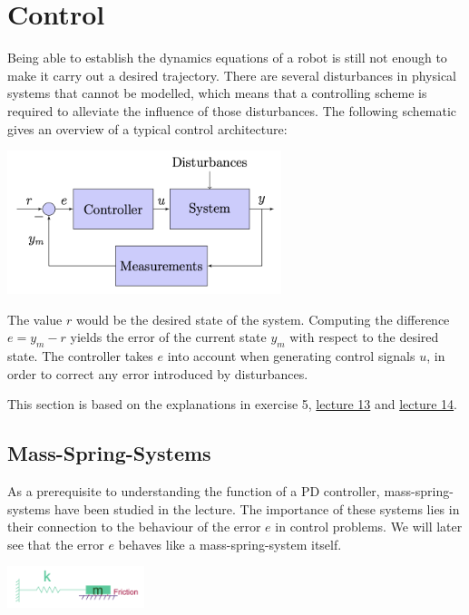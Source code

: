 \section{Control}

Being able to establish the dynamics equations of a robot is still not enough to make it carry out a desired trajectory. There are several disturbances in physical systems that cannot be modelled, which means that a controlling scheme is required to alleviate the influence of those disturbances. The following schematic gives an overview of a typical control architecture:

\begin{center}
	\includegraphics[width=8cm]{sections/imgs/7_control_architecture.png}
\end{center}

The value $r$ would be the desired state of the system. Computing the difference $e=y_{m}-r$ yields the error of the current state $y_{m}$ with respect to the desired state. The controller takes $e$ into account when generating control signals $u$, in order to correct any error introduced by disturbances.

This section is based on the explanations in exercise 5, \href{https://www.youtube.com/watch?v=5-k2RzfIgoU&list=PL65CC0384A1798ADF&index=14}{lecture 13} and \href{https://www.youtube.com/watch?v=U3diaQ-iU0I&list=PL65CC0384A1798ADF&index=16}{lecture 14}.

\subsection{Mass-Spring-Systems}

As a prerequisite to understanding the function of a PD controller, mass-spring-systems have been studied in the lecture. The importance of these systems lies in their connection to the behaviour of the error $e$ in control problems. We will later see that the error $e$ behaves like a mass-spring-system itself.

\begin{center}
	\includegraphics[width=4cm]{sections/imgs/7_mass_spring_system.png}
\end{center}

